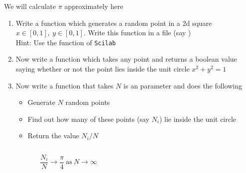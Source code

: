 \documentclass[%
    10pt,
    xcolor={dvipsnames},
    compress, %
]{beamer}
\newcommand{\hint}[1]{{\small\alert{Hint: #1}}}
\newcommand{\scilab}{\texttt{Scilab}}
\begin{document}
\begin{frame}[fragile]
    \begin{exercise}
        We will calculate $\pi$ approximately here
        \begin{enumerate}
            \item Write a function  which generates a random point in a 2d square $x \in [0,1],\ y \in [0,1]$. Write this function in a file (say )\\
            \hint{Use the  function of \scilab}
            \item<2-> Now write a function  which takes any point and returns a boolean value saying whether or not the point lies inside the unit circle $x^2+y^2=1$
            \item<3-> Now write a function that takes $N$ is an parameter and does the following
            \begin{itemize}
                \item Generate $N$ random points
                \item Find out how many of these points (say $N_i$) lie inside the unit circle
                \item Return the value $N_i/N$
            \end{itemize}
        \end{enumerate}
        \begin{columns}
            \begin{column}{0.5\linewidth}
                \begin{equation*}
                    \frac{N_i}{N} \to \frac{\pi}{4}\ \text{as}\ N \to \infty
                \end{equation*}
            \end{column}
            \begin{column}{0.5\linewidth}
                \begin{figure}
                    \centering
                \end{figure}
            \end{column}
        \end{columns}
    \end{exercise}
\end{frame}
\end{document}
